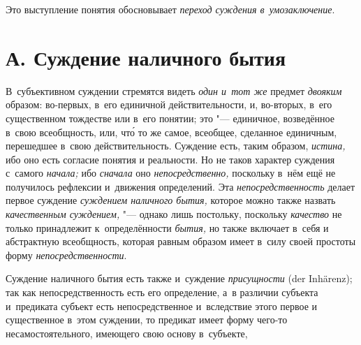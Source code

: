 Это выступление понятия обосновывает {\em переход суждения в~умозаключение}.

\section[А. Суждение наличного бытия]{А. Суждение наличного бытия}

В~субъективном суждении стремятся видеть {\em один и~тот же} предмет
{\em двояким} образом: во-первых, в~его единичной действительности, и,
во-вторых, в~его существенном тождестве или в~его понятии; это
"--- единичное, возведённое в~свою всеобщность, или, чт\'{о} то же
самое, всеобщее, сделанное единичным, перешедшее в~свою действительность.
Суждение есть, таким образом, {\em истина,} ибо оно есть согласие понятия и
реальности. Но не таков характер суждения с~самого {\em начала;} ибо
{\em сначала} оно {\em непосредственно,} поскольку в~нём ещё не получилось
рефлексии и~движения определений. Эта {\em непосредственность} делает первое
суждение {\em суждением наличного бытия,} которое можно также назвать {\em
качественным суждением,} "--- однако лишь постольку, поскольку {\em качество}
не только принадлежит к~определённости {\em бытия,} но также включает в~себя и
абстрактную всеобщность, которая равным образом имеет в~силу своей простоты
форму {\em непосредственности}.

Суждение наличного бытия есть также и~суждение {\em присущности} (der
Inhärenz); так как непосредственность есть его определение, а~в различии
субъекта и~предиката субъект есть непосредственное и~вследствие этого первое и
существенное в~этом суждении, то предикат имеет форму чего-то
несамостоятельного, имеющего свою основу в~субъекте,


